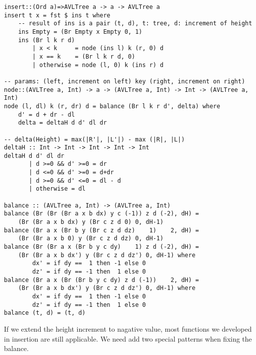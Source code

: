 \documentclass{article}
\begin{document}
\begin{lstlisting}[caption=AVL tree insertion algorithm with Pattern matching approach.]
insert::(Ord a)=>AVLTree a -> a -> AVLTree a
insert t x = fst $ ins t where
    -- result of ins is a pair (t, d), t: tree, d: increment of height
    ins Empty = (Br Empty x Empty 0, 1)
    ins (Br l k r d)
        | x < k     = node (ins l) k (r, 0) d
        | x == k    = (Br l k r d, 0)
        | otherwise = node (l, 0) k (ins r) d

-- params: (left, increment on left) key (right, increment on right)
node::(AVLTree a, Int) -> a -> (AVLTree a, Int) -> Int -> (AVLTree a, Int)
node (l, dl) k (r, dr) d = balance (Br l k r d', delta) where
    d' = d + dr - dl
    delta = deltaH d d' dl dr

-- delta(Height) = max(|R'|, |L'|) - max (|R|, |L|)
deltaH :: Int -> Int -> Int -> Int -> Int
deltaH d d' dl dr
       | d >=0 && d' >=0 = dr
       | d <=0 && d' >=0 = d+dr
       | d >=0 && d' <=0 = dl - d
       | otherwise = dl

balance :: (AVLTree a, Int) -> (AVLTree a, Int)
balance (Br (Br (Br a x b dx) y c (-1)) z d (-2), dH) =
    (Br (Br a x b dx) y (Br c z d 0) 0, dH-1)
balance (Br a x (Br b y (Br c z d dz)    1)    2, dH) =
    (Br (Br a x b 0) y (Br c z d dz) 0, dH-1)
balance (Br (Br a x (Br b y c dy)    1) z d (-2), dH) =
    (Br (Br a x b dx') y (Br c z d dz') 0, dH-1) where
        dx' = if dy ==  1 then -1 else 0
        dz' = if dy == -1 then  1 else 0
balance (Br a x (Br (Br b y c dy) z d (-1))    2, dH) =
    (Br (Br a x b dx') y (Br c z d dz') 0, dH-1) where
        dx' = if dy ==  1 then -1 else 0
        dz' = if dy == -1 then  1 else 0
balance (t, d) = (t, d)
\end{lstlisting}

If we extend the height increment to nagative value, most functions we developed
in insertion are still applicable. We need add two special patterns when fixing
the balance.
\end{document}
